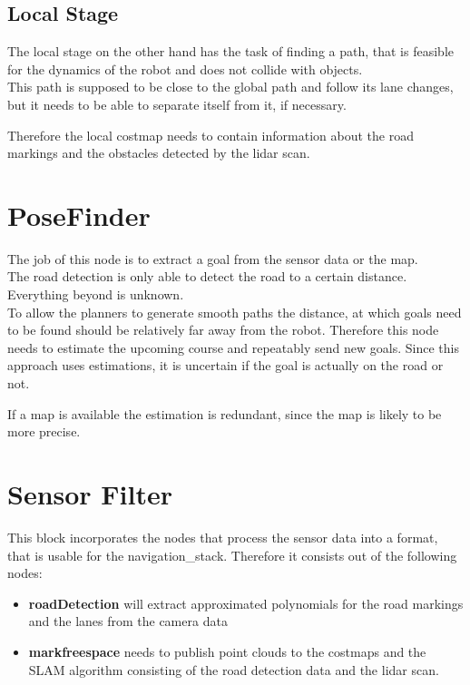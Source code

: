 \subsection{Local Stage}
The local stage on the other hand has the task of finding a path, that is feasible for the dynamics of the robot and does not collide with objects.\\
This path is supposed to be close to the global path and follow its lane changes, but it needs to be able to separate itself from it, if necessary.

Therefore the local costmap needs to contain information about the road markings and the obstacles detected by the lidar scan.

\section{PoseFinder}
The job of this node is to extract a goal from the sensor data or the map.\\

The road detection is only able to detect the road to a certain distance. Everything beyond is unknown.\\
To allow the planners to generate smooth paths the distance, at which goals need to be found should be relatively far away from the robot. Therefore this node needs to estimate the upcoming course and repeatably send new goals. Since this approach uses estimations, it is uncertain if the goal is actually on the road or not.

If a map is available the estimation is redundant, since the map is likely to be more precise.

\section{Sensor Filter}

This block incorporates the nodes that process the sensor data into a format, that is usable for the navigation\_stack. 
Therefore it consists out of the following nodes:

\begin{itemize}
	\item \textbf{roadDetection} will extract approximated polynomials for the road markings and the lanes from the camera data
	\item \textbf{markfreespace} needs to publish point clouds to the costmaps and the SLAM algorithm consisting of the road detection data and the lidar scan.
\end{itemize}

